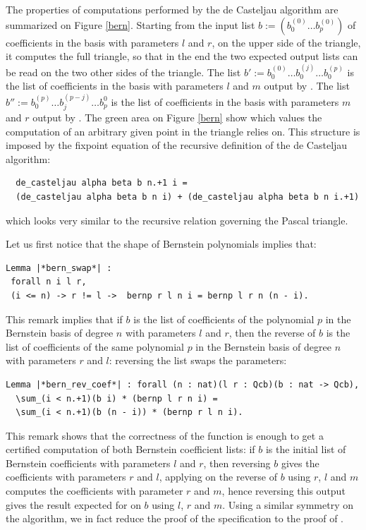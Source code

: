 \documentclass{mscs}
\begin{document}
The properties of computations performed by the de Casteljau algorithm
are summarized on Figure \ref{bern}. Starting from the input list
$b := (b_0^(0)\dots b_p^{(0)})$ of coefficients in the basis with
parameters $l$ and $r$, on the upper side of the triangle, it
computes the full triangle, so that in the end the two expected output
lists can be read on the two  other sides of the triangle. The list
$b' := b_0^{(0)} \dots b_0^{(j)} \dots b_0^{(p)}$ is the list of
coefficients in the basis with parameters $l$ and $m$ output by
. The list
$b'' := b_0^{(p)} \dots b_j^{(p - j)} \dots b_p^{0}$
 is the list of coefficients in the basis with parameters $m$ and $r$
 output by .  The green area on Figure \ref{bern} show which values
the computation of an arbitrary given point in the triangle relies on.
This structure is imposed by the fixpoint
 equation of the recursive definition of the de Casteljau algorithm:
\begin{lstlisting}
  de_casteljau alpha beta b n.+1 i =
  (de_casteljau alpha beta b n i) + (de_casteljau alpha beta b n i.+1)
\end{lstlisting}
which looks very similar to the recursive relation governing the
Pascal triangle.

Let us first notice that the shape of Bernstein polynomials implies
that:
\begin{lstlisting}
Lemma |*bern_swap*| :
 forall n i l r,
 (i <= n) -> r != l ->  bernp r l n i = bernp l r n (n - i).
\end{lstlisting}
This remark implies that if $b$ is the list of coefficients of the
polynomial $p$ in the Bernstein basis of degree $n$ with parameters
$l$ and $r$, then the reverse of $b$ is the list of coefficients of
the same polynomial $p$ in the Bernstein basis of degree $n$ with
parameters $r$ and $l$: reversing the list swaps the parameters:

\begin{lstlisting}
Lemma |*bern_rev_coef*| : forall (n : nat)(l r : Qcb)(b : nat -> Qcb),
  \sum_(i < n.+1)(b i) * (bernp l r n i) =
  \sum_(i < n.+1)(b (n - i)) * (bernp r l n i).
\end{lstlisting}
This remark shows that the correctness of the  function is
enough to get a certified computation of both Bernstein coefficient
lists: if $b$ is the
initial list of Bernstein coefficients with parameters $l$ and $r$, then
reversing $b$ gives the  coefficients with parameters $r$ and $l$,
applying  on the reverse of $b$ using $r$, $l$ and $m$
computes the coefficients with parameter $r$ and $m$, hence reversing
this output gives the result expected for  on $b$ using $l$,
$r$ and $m$. Using a similar symmetry on the
 algorithm, we in fact reduce the proof of the
 specification to the proof of .
\end{document}
